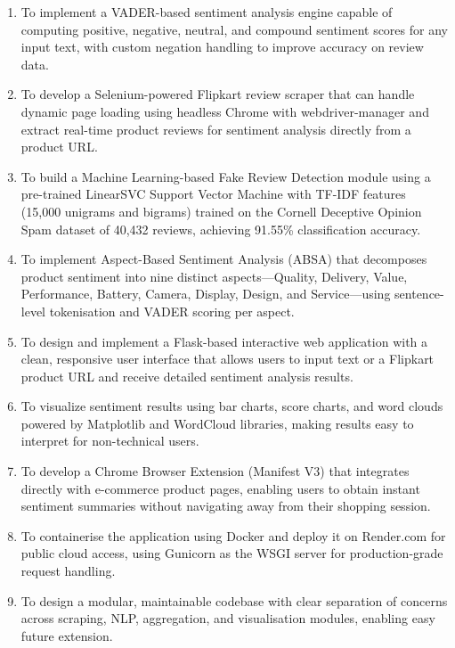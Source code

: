 \documentclass[12pt,a4paper]{report}
\begin{document}
\begin{enumerate}
  \item To implement a VADER-based sentiment analysis engine capable of computing positive, negative, neutral, and compound sentiment scores for any input text, with custom negation handling to improve accuracy on review data.

  \item To develop a Selenium-powered Flipkart review scraper that can handle dynamic page loading using headless Chrome with webdriver-manager and extract real-time product reviews for sentiment analysis directly from a product URL.

  \item To build a Machine Learning-based Fake Review Detection module using a pre-trained LinearSVC Support Vector Machine with TF-IDF features (15,000 unigrams and bigrams) trained on the Cornell Deceptive Opinion Spam dataset of 40,432 reviews, achieving 91.55\% classification accuracy.

  \item To implement Aspect-Based Sentiment Analysis (ABSA) that decomposes product sentiment into nine distinct aspects---Quality, Delivery, Value, Performance, Battery, Camera, Display, Design, and Service---using sentence-level tokenisation and VADER scoring per aspect.

  \item To design and implement a Flask-based interactive web application with a clean, responsive user interface that allows users to input text or a Flipkart product URL and receive detailed sentiment analysis results.

  \item To visualize sentiment results using bar charts, score charts, and word clouds powered by Matplotlib and WordCloud libraries, making results easy to interpret for non-technical users.

  \item To develop a Chrome Browser Extension (Manifest V3) that integrates directly with e-commerce product pages, enabling users to obtain instant sentiment summaries without navigating away from their shopping session.

  \item To containerise the application using Docker and deploy it on Render.com for public cloud access, using Gunicorn as the WSGI server for production-grade request handling.

  \item To design a modular, maintainable codebase with clear separation of concerns across scraping, NLP, aggregation, and visualisation modules, enabling easy future extension.
\end{enumerate}
\end{document}
